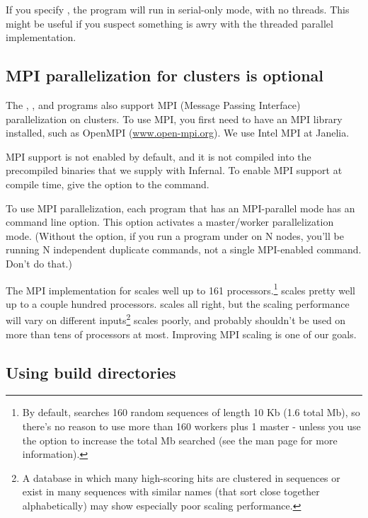 If you specify , the program will run in serial-only
mode, with no threads. This might be useful if you suspect something
is awry with the threaded parallel implementation.

\subsection{MPI parallelization for clusters is optional}

The , ,  and
 programs also support MPI (Message Passing Interface)
parallelization on clusters.  To use MPI, you first need to have an
MPI library installed, such as OpenMPI (\url{www.open-mpi.org}). We
use Intel MPI at Janelia.

MPI support is not enabled by default, and it is not compiled into the
precompiled binaries that we supply with Infernal. To enable MPI support
at compile time, give the  option to the
 command.

To use MPI parallelization, each program that has an MPI-parallel mode
has an  command line option. This option activates a
master/worker parallelization mode. (Without the  option,
if you run a program under  on N nodes, you'll be
running N independent duplicate commands, not a single MPI-enabled
command. Don't do that.)

The MPI implementation for  scales well up to 161
processors.\footnote{By default,  searches 160
random sequences of length 10 Kb (1.6 total Mb), so there's no reason
to use more than 160 workers plus 1 master - unless you use the
 option to increase the total Mb searched (see the
 man page for more information).} 
scales pretty well up to a couple hundred processors. 
scales all right, but the scaling performance will vary on different
inputs\footnote{A database in which many high-scoring hits are
  clustered in sequences or exist in many sequences with similar names
  (that sort close together alphabetically) may show especially poor
  scaling performance.}  scales poorly, and probably
shouldn't be used on more than tens of processors at most. Improving
MPI scaling is one of our goals.

\subsection{Using build directories}

